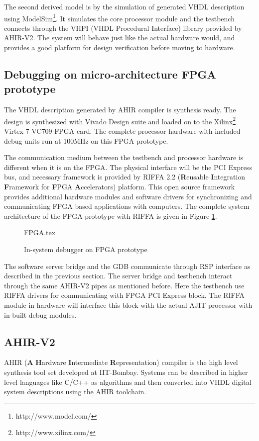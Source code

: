 The second derived model is by the simulation of generated VHDL description using ModelSim\footnote{http://www.model.com/}. It simulates the core processor module and the testbench connects through the VHPI (VHDL Procedural Interface) library provided by AHIR-V2. The system will behave just like the actual hardware would, and provides a good platform for design verification before moving to hardware.

\subsection{Debugging on micro-architecture FPGA prototype}
The VHDL description generated by AHIR compiler is synthesis ready. The design is synthesized with Vivado\textsuperscript{\textregistered} Design suite and loaded on to the Xilinx\footnote{http://www.xilinx.com/} Virtex-7 VC709 FPGA card. The complete processor hardware with included debug units run at 100MHz on this FPGA prototype.

The communication medium between the testbench and processor hardware is different when it is on the FPGA. The physical interface will be the PCI Express bus, and necessary framework is provided by RIFFA 2.2 (\textbf{R}eusable \textbf{I}ntegration \textbf{F}ramework for \textbf{F}PGA \textbf{A}ccelerators)\cite{riffaPaper} platform. This open source framework provides additional hardware modules and software drivers for synchronizing and communicating FPGA based applications with computers. The complete system architecture of the FPGA prototype with RIFFA is given in Figure \ref{FPGA}.

\begin{figure}[h!]
	\centering
	\def\svgwidth{0.6\columnwidth}
	{FPGA.tex}
	\caption{In-system debugger on FPGA prototype}
	\label{FPGA}
\end{figure}

The software server bridge and the GDB communicate through RSP interface as described in the previous section. The server bridge and testbench interact through the same AHIR-V2 pipes as mentioned before. Here the testbench use RIFFA drivers for communicating with FPGA PCI Express block. The RIFFA module in hardware will interface this block with the actual AJIT processor with in-built debug modules.

\subsection{AHIR-V2}
AHIR (\textbf{A} \textbf{H}ardware \textbf{I}ntermediate \textbf{R}epresentation) compiler\cite{AhirThesis} is the high level synthesis tool set developed at IIT-Bombay. Systems can be described in higher level languages like C/C++ as algorithms and then converted into VHDL digital system descriptions using the AHIR toolchain.

